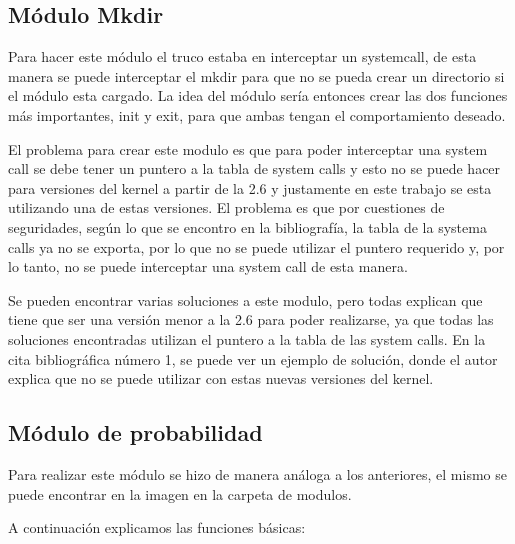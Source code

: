 \documentclass[a4paper, 12pt]{article}
\begin{document}
\subsection*{M\'odulo Mkdir}

Para hacer este m\'odulo el truco estaba en interceptar un systemcall, de esta manera se puede interceptar el mkdir para que no se pueda crear un directorio si el m\'odulo esta cargado. La idea del m\'odulo ser\'ia entonces crear las dos funciones m\'as importantes, init y exit, para que ambas tengan el comportamiento deseado.

El problema para crear este modulo es que para poder interceptar una system call se debe tener un puntero a la tabla de system calls y esto no se puede hacer para versiones del kernel a partir de la 2.6 y justamente en este trabajo se esta utilizando una de estas versiones. El problema es que por cuestiones de seguridades, seg\'un lo que se encontro en la bibliograf\'ia, la tabla de la systema calls ya no se exporta, por lo que no se puede utilizar el puntero requerido y, por lo tanto, no se puede interceptar una system call de esta manera. 

Se pueden encontrar varias soluciones a este modulo, pero todas explican que tiene que ser una versi\'on menor a la 2.6 para poder realizarse, ya que todas las soluciones encontradas utilizan el puntero a la tabla de las system calls. En la cita bibliogr\'afica n\'umero 1, se puede ver un ejemplo de soluci\'on, donde el autor explica que no se puede utilizar con estas nuevas versiones del kernel.


\subsection*{M\'odulo de probabilidad}


Para realizar este m\'odulo se hizo de manera an\'aloga a los anteriores, el mismo se puede encontrar en la imagen en la carpeta de modulos. 

A continuaci\'on explicamos las funciones b\'asicas:
\end{document}
